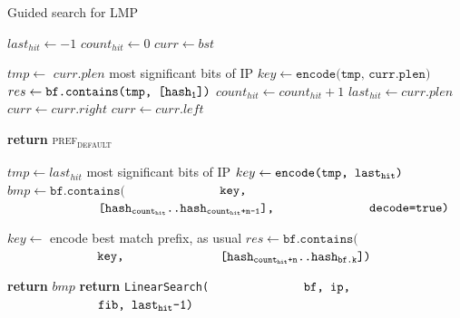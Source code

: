 \documentclass[conference,compsoc]{IEEEtran}
\begin{document}
\begin{algorithm}
  \caption{Guided search for LMP}\label{alg:guidedsearch}
  \begin{algorithmic}[1]

      \State $last_{hit} \gets -1$
      \State $count_{hit} \gets 0$
      \State $curr \gets bst$

        \State $tmp \gets$ $curr.plen$ most significant bits of IP
        \State $key \gets \texttt{encode(tmp, curr.plen)}$
        \State $res \gets \texttt{bf.contains(tmp, [hash\textsubscript{1}])}$
          \State $count_{hit} \gets count_{hit} + 1$
          \State $last_{hit} \gets curr.plen$
          \State $curr \gets curr.right$
        \Else
          \State $curr \gets curr.left$
        \EndIf
      \EndWhile{}

        \State \textbf{return} \textsc{pref\textsubscript{default}}
      \EndIf

      \State $tmp \gets last_{hit}$ most significant bits of IP
      \State $key \gets \texttt{encode(tmp, last\textsubscript{hit})}$
      \State $bmp \gets \texttt{bf.contains(}$
              \State $\hspace*{25mm} \texttt{key,}$
              \State $\hspace*{25mm} \texttt{[hash\textsubscript{count\textsubscript{hit}}..hash\textsubscript{count\textsubscript{hit}+n-1}],}$
              \State $\hspace*{25mm} \texttt{decode=true)}$

        \State $key \gets$ encode best match prefix, as usual
        \State $res \gets \texttt{bf.contains(}$
              \State $\hspace*{25mm} \texttt{key,}$
              \State $\hspace*{25mm} \texttt{[hash\textsubscript{count\textsubscript{hit}+n}..hash\textsubscript{bf.k}])}$

            \State \textbf{return} $bmp$
        \Else
            \State \textbf{return} \texttt{LinearSearch(}
            \State $\hspace*{25mm} \texttt{bf, ip,}$
            \State $\hspace*{25mm} \texttt{fib, last\textsubscript{hit}-1)}$
        \EndIf
      \EndIf
    \EndProcedure

  \end{algorithmic}
\end{algorithm}
\end{document}
